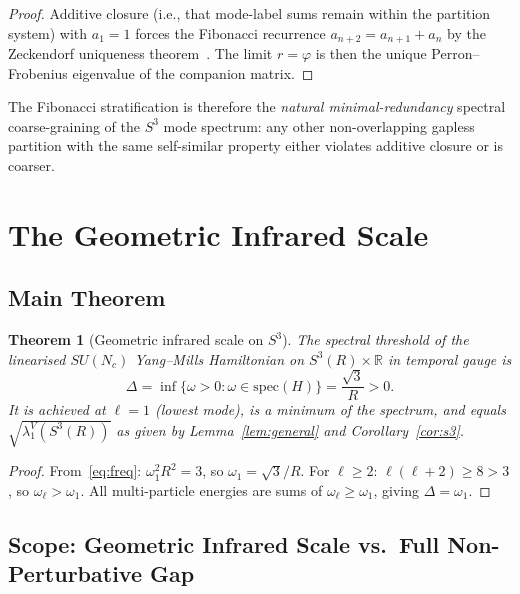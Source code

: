 \documentclass[
  aps,
  prd,
  reprint,
  superscriptaddress,
  nofootinbib,
  longbibliography,
  amsmath,
  amssymb
]{revtex4-2}
\theoremstyle{plain}
\newtheorem{theorem}{Theorem}[section]
\theoremstyle{definition}
\theoremstyle{remark}
\newcommand{\vp}{\varphi}
\newcommand{\SU}[1]{SU(#1)}
\begin{document}
\begin{proof}
  Additive closure (i.e., that mode-label sums remain within the
  partition system) with $a_1=1$ forces the Fibonacci recurrence
  $a_{n+2}=a_{n+1}+a_n$ by the Zeckendorf uniqueness
  theorem~\cite{Zeckendorf1972}. The limit $r=\vp$ is then the unique
  Perron--Frobenius eigenvalue of the companion matrix.
\end{proof}

The Fibonacci stratification is therefore the \emph{natural minimal-redundancy}
spectral coarse-graining of the $S^3$ mode spectrum: any other
non-overlapping gapless partition with the same self-similar property
either violates additive closure or is coarser.

\section{The Geometric Infrared Scale}
\label{sec:massgap}

\subsection{Main Theorem}

\begin{theorem}[Geometric infrared scale on $S^3$]
  \label{thm:massgap}
  The spectral threshold of the linearised $\SU{N_c}$ Yang--Mills
  Hamiltonian on $S^3(R)\times\mathbb{R}$ in temporal gauge is
  \begin{equation}
    \boxed{\Delta = \inf\{\omega>0:\omega\in\mathrm{spec}(H)\}
      = \frac{\sqrt3}{R} > 0.}
    \label{eq:gap}
  \end{equation}
  It is achieved at $\ell=1$ (lowest mode), is a minimum of the
  spectrum, and equals $\sqrt{\lambda_1^V(S^3(R))}$ as given by
  Lemma~\ref{lem:general} and Corollary~\ref{cor:s3}.
\end{theorem}

\begin{proof}
  From~\eqref{eq:freq}: $\omega_1^2R^2=3$, so $\omega_1=\sqrt3/R$.
  For $\ell\geq2$: $\ell(\ell+2)\geq8>3$, so $\omega_\ell>\omega_1$.
  All multi-particle energies are sums of $\omega_\ell\geq\omega_1$,
  giving $\Delta=\omega_1$.
\end{proof}

\subsection{Scope: Geometric Infrared Scale vs.\ Full Non-Perturbative Gap}
\end{document}
